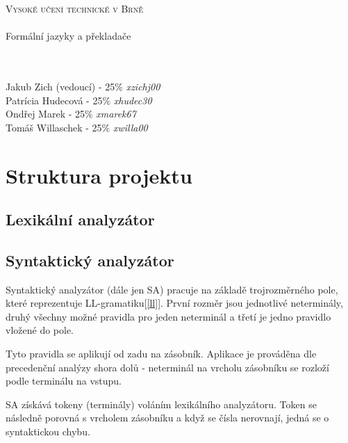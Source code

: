 \documentclass[11pt, a4paper]{article}
\begin{document}
	
	\begin{titlepage}
		\begin{center}
			 \textsc{{\Huge Vysoké učení technické v Brně}\\ 
			 \vspace{8.5pt}{\huge Fakulta informačních technologií}}\\
			{\LARGE Formální jazyky a překladače\\}
				\vspace{5pt}{\Huge Dokumentace ke skupinovému projektu}\\
				\vspace{2pt}{\Large Tým 47, varianta I}
			\\
		\end{center}
		Jakub Zich (vedoucí) - 25\% \emph{xzichj00} \hfill \\
		Patrícia Hudecová - 25\% \emph{xhudec30} \hfill \\
		Ondřej Marek - 25\% \emph{xmarek67} \hfill\\
		Tomáš Willaschek - 25\% \emph{xwilla00} \hfill
	
	\end{titlepage}	
	\section{Struktura projektu}
	
	\subsection{Lexikální analyzátor}
	\subsection{Syntaktický analyzátor}
	Syntaktický analyzátor (dále jen SA) pracuje na základě trojrozměrného pole, které reprezentuje LL-gramatiku[\ref{ll}]. První rozměr jsou jednotlivé neterminály, druhý všechny možné pravidla pro jeden neterminál a třetí je jedno pravidlo vložené do pole.
	
		Tyto pravidla se aplikují od zadu na zásobník. Aplikace je prováděna dle precedenční analýzy shora dolů - neterminál na vrcholu zásobníku se rozloží podle terminálu na vstupu. 
		
		SA získává tokeny (terminály) voláním lexikálního analyzátoru. Token se následně porovná s vrcholem zásobníku a když se čísla nerovnají, jedná se o syntaktickou chybu.
		
\end{document}
